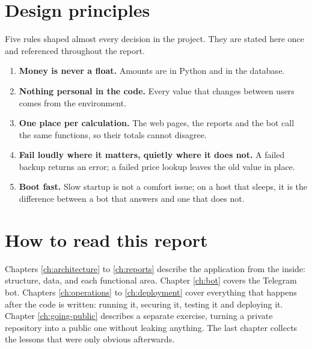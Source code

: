 \section{Design principles}

Five rules shaped almost every decision in the project. They are stated here
once and referenced throughout the report.

\begin{keypoint}
\begin{enumerate}
  \item \textbf{Money is never a float.} Amounts are  in Python
        and  in the database.
  \item \textbf{Nothing personal in the code.} Every value that changes between
        users comes from the environment.
  \item \textbf{One place per calculation.} The web pages, the reports and the
        bot call the same functions, so their totals cannot disagree.
  \item \textbf{Fail loudly where it matters, quietly where it does not.} A
        failed backup returns an error; a failed price lookup leaves the old
        value in place.
  \item \textbf{Boot fast.} Slow startup is not a comfort issue; on a host that
        sleeps, it is the difference between a bot that answers and one that
        does not.
\end{enumerate}
\end{keypoint}

\section{How to read this report}

Chapters \ref{ch:architecture} to \ref{ch:reports} describe the application from
the inside: structure, data, and each functional area. Chapter
\ref{ch:bot} covers the Telegram bot. Chapters \ref{ch:operations} to
\ref{ch:deployment} cover everything that happens after the code is written:
running it, securing it, testing it and deploying it. Chapter
\ref{ch:going-public} describes a separate exercise, turning a private
repository into a public one without leaking anything. The last chapter collects
the lessons that were only obvious afterwards.
